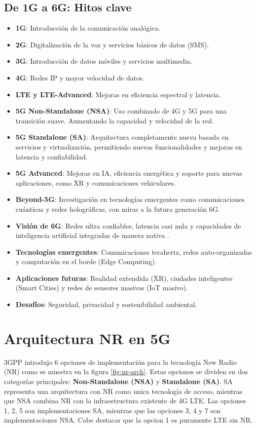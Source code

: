 \subsection{De 1G a 6G: Hitos clave}
\begin{itemize}
\item \textbf{1G}: Introducción de la comunicación analógica.
\item \textbf{2G}: Digitalización de la voz y servicios básicos de datos (SMS).
\item \textbf{3G}: Introducción de datos móviles y servicios multimedia.
\item \textbf{4G}: Redes IP y mayor velocidad de datos.
\item \textbf{LTE y LTE-Advanced}: Mejoras en eficiencia espectral y latencia.
\item \textbf{5G Non-Standalone (NSA)}: Uso combinado de 4G y 5G para una transición suave. Aumentando la capacidad y velocidad de la red.
\item \textbf{5G Standalone (SA)}: Arquitectura completamente nueva basada en servicios y virtualización, permitiendo nuevas funcionalidades y mejoras en latencia y confiabilidad.
\item \textbf{5G Advanced}: Mejoras en IA, eficiencia energética y soporte para nuevas aplicaciones, como XR y comunicaciones vehiculares.
\item \textbf{Beyond-5G}: Investigación en tecnologías emergentes como comunicaciones cuánticas y redes holográficas, con miras a la futura generación 6G.
\item \textbf{Visión de 6G}: Redes ultra confiables, latencia casi nula y capacidades de inteligencia artificial integradas de manera nativa \cite{saad20206g,dang2020should}.
\item \textbf{Tecnologías emergentes}: Comunicaciones terahertz, redes auto-organizadas y computación en el borde (Edge Computing).
\item \textbf{Aplicaciones futuras}: Realidad extendida (XR), ciudades inteligentes (Smart Cities) y redes de sensores masivos (IoT masivo).
\item \textbf{Desafíos}: Seguridad, privacidad y sostenibilidad ambiental.
\end{itemize}

\section{Arquitectura NR en 5G}
3GPP \cite{3gpp.23.799,3gpp.sp.160455} introdujo 6 opciones de implementación para la tecnología New Radio (NR) como se muestra en la figura \ref{fig:nr-arch}. Estas opciones se dividen en dos categorías principales: \textbf{Non-Standalone (NSA)} y \textbf{Standalone (SA)}. 
SA representa una arquitectura con NR como unica tecnología de acceso, mientras que NSA combina NR con la infraestructura existente de 4G LTE. Las opciones 1, 2, 5 son implementaciones SA, mientras que las opciones 3, 4 y 7 son implementaciones NSA. Cabe destacar que la opcion 1 es puramente LTE sin NR.

